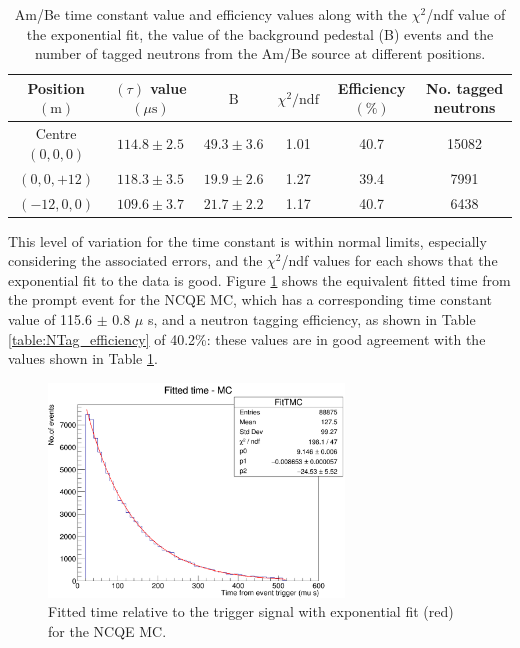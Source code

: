 \begin{table}
    \centering
    \begin{tabular}{||c|c|c|c|c|c||}
        \hline Position $(\mathrm{m})$ & $(\tau)$ value $(\mu \mathrm{s})$ & $\mathrm{B}$ & $\chi^2 / \mathrm{ndf}$ & Efficiency $(\%)$ & No. tagged neutrons \\
        \hline Centre $(0,0,0)$ & $114.8 \pm 2.5$ & $49.3 \pm 3.6$ & 1.01 & 40.7 & 15082 \\
        \hline$(0,0,+12)$ & $118.3 \pm 3.5$ & $19.9 \pm 2.6$ & 1.27 & 39.4 & 7991 \\
        \hline$(-12,0,0)$ & $109.6 \pm 3.7$ & $21.7 \pm 2.2$ & 1.17 & 40.7 & 6438 \\
        \hline
        \end{tabular}
    \caption{Am/Be time constant value and efficiency values along with the $\chi^{2}$/ndf value of the exponential fit, the value of the background pedestal (B) events and the number of tagged neutrons from the Am/Be source at different positions.}
    \label{table:ambe_tau_chi2}
\end{table}

This level of variation for the time constant is within normal limits, especially considering the associated errors, and the $\chi^{2}$/ndf values for each shows that the exponential fit to the data is good. Figure \ref{fig:MC_time_constant} shows the equivalent fitted time from the prompt event for the NCQE MC, which has a corresponding time constant value of 115.6 $\pm$ 0.8 $\mu$ s, and a neutron tagging efficiency, as shown in Table \ref{table:NTag_efficiency} of 40.2\%: these values are in good agreement with the values shown in Table \ref{table:ambe_tau_chi2}. 

\begin{figure}
    \centering
    \includegraphics[width=0.7\textwidth]{Figures/MC_fitT.png}
    \caption{Fitted time relative to the trigger signal with exponential fit (red) for the NCQE MC.}
    \label{fig:MC_time_constant}
\end{figure}

